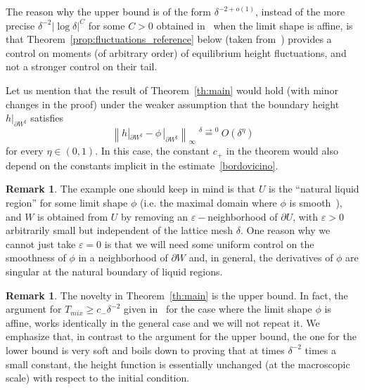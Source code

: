 \documentclass[10pt]{amsart}
\theoremstyle{definition}\newtheorem{defi}[theo]{Definition}\newtheorem{rema}[theo]{Remark}\newtheorem{exam}[theo]{Example}\newtheorem{exem}[theo]{Example}\newtheorem{nota}[theo]{Notation}
\renewcommand{\d}{{\sharp }}
\begin{document}
The reason why the upper bound is of the form $\delta^{-2+o(1)}$, instead of the more precise $\delta^{-2}|\log \delta|^C$ for some $C>0$ obtained in~\cite{CMT} when the limit shape is affine, is that
Theorem~\ref{prop:fluctuations_reference} below (taken from~\cite{L_arxiv}) provides a control on moments (of arbitrary order) of equilibrium height fluctuations, and not a stronger control on their tail.

Let us mention that the result of Theorem~\ref{th:main} would hold (with minor changes in the proof) under the weaker assumption that the boundary height $h|_{\partial W^\d}$ satisfies
\begin{equation}\label{bordovicino}
\left\|h|_{\partial W^\d}-\phi\,|_{\partial W^\d}\right\|_\infty\stackrel {\delta\,\to\,0}=O(\delta^\eta)
\end{equation}
for every $\eta\in (0,1)$. In this case, the constant $c_+$ in the theorem would also depend on the constants implicit in the estimate~\eqref{bordovicino}.



\begin{rema}
The example one should keep in mind is that $U$ is the ``natural liquid region'' for some limit shape $\phi$ (i.e. the maximal domain where $\phi$ is smooth~\cite{KO}), and $W$ is obtained from $U$ by removing an $\varepsilon-$neighborhood of $\partial U$, with $\varepsilon>0$ arbitrarily small but independent of the lattice mesh $\delta$. One reason why we cannot just take $\varepsilon=0$ is that we will need some uniform control on the smoothness of $\phi$ in a neighborhood of $\partial W$ and, in general, the derivatives of $\phi$ are singular at the natural boundary of liquid regions.
\end{rema}

\begin{rema}
The novelty in Theorem~\ref{th:main} is the upper bound. In fact, the argument for $T_{mix}\ge c_-\delta^{-2}$ given in~\cite[Sec.~5.2]{LT_ptrf} for the case where the limit shape $\phi$ is affine, works identically in the general case and we will not repeat it. We emphasize that, in contrast to the argument for the upper bound, the one for the lower bound is very soft and boils down to proving that at times $\delta^{-2}$ times a small constant, the height function is essentially unchanged (at the macroscopic scale) with respect to the initial condition.
\end{rema}
\end{document}
